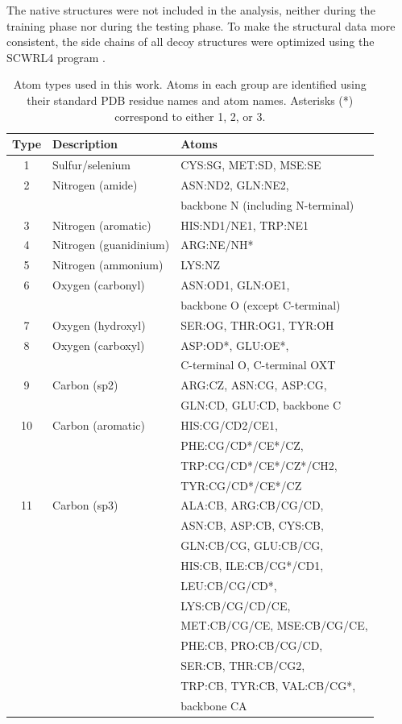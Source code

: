 \documentclass{bioinfo}
\begin{document}
The native structures were not included in the analysis, neither
during the training phase nor during the testing phase. To make the
structural data more consistent, the side chains of all decoy
structures were optimized using the SCWRL4 program
\citep{krivov2009improved}.
%
\begin{table}[H]
%
  \caption {Atom types used in this work. Atoms in each group are
    identified using their standard PDB residue names and atom
    names. Asterisks (*) correspond to either 1, 2, or 3.}
%
\begin{tabular}{ c | l | l }
    Type & Description & Atoms \\
    \hline
    1 & Sulfur/selenium & CYS:SG, MET:SD, MSE:SE \\ \hline
    2 & Nitrogen (amide) & ASN:ND2, GLN:NE2, \\
     & & backbone N (including N-terminal) \\ \hline
    3 & Nitrogen (aromatic) & HIS:ND1/NE1, TRP:NE1 \\ \hline
    4 & Nitrogen (guanidinium) & ARG:NE/NH* \\ \hline
    5 & Nitrogen (ammonium) & LYS:NZ \\ \hline
    6 & Oxygen (carbonyl) & ASN:OD1, GLN:OE1, \\
     & & backbone O (except C-terminal) \\ \hline
    7 & Oxygen (hydroxyl) & SER:OG, THR:OG1, TYR:OH \\ \hline
    8 & Oxygen (carboxyl) & ASP:OD*, GLU:OE*, \\
     & & C-terminal O, C-terminal OXT \\ \hline
    9 & Carbon (sp2) & ARG:CZ, ASN:CG, ASP:CG, \\
     & & GLN:CD, GLU:CD, backbone C \\ \hline
    10 & Carbon (aromatic) & HIS:CG/CD2/CE1, \\
     & & PHE:CG/CD*/CE*/CZ, \\ 
     & & TRP:CG/CD*/CE*/CZ*/CH2, \\
     & & TYR:CG/CD*/CE*/CZ \\ \hline
    11 & Carbon (sp3) & ALA:CB, ARG:CB/CG/CD, \\
     & & ASN:CB, ASP:CB, CYS:CB, \\
     & & GLN:CB/CG, GLU:CB/CG, \\
     & & HIS:CB, ILE:CB/CG*/CD1, \\
     & & LEU:CB/CG/CD*, \\
     & & LYS:CB/CG/CD/CE, \\
     & & MET:CB/CG/CE, MSE:CB/CG/CE, \\
     & & PHE:CB, PRO:CB/CG/CD, \\
     & & SER:CB, THR:CB/CG2, \\
     & & TRP:CB, TYR:CB, VAL:CB/CG*, \\
     & & backbone CA \\ \hline    
\end{tabular}
\label{Tbl:atomTypes}
\end{table}
\end{document}
